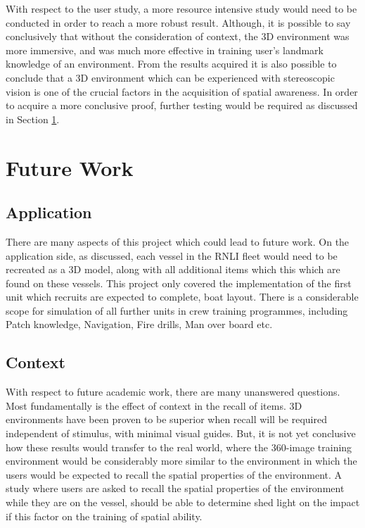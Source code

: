 \documentclass[ %
                    author={Elis Jones},
                supervisor={Dr. Kirsten Cater},
                    degree={BSc},
                     title={The Effect of Presentation Medium on Spatial Cognition},
                  subtitle={in the Virtual Environment},
                      year={2018} ]{dissertation}
\begin{document}
With respect to the user study, a more resource intensive study would need to be conducted in order to reach a more robust result. Although, it is possible to say conclusively that without the consideration of context, the 3D environment was more immersive, and was much more effective in training user's landmark knowledge of an environment. From the results acquired it is also possible to conclude that a 3D environment which can be experienced with stereoscopic vision is one of the crucial factors in the acquisition of spatial awareness. In order to acquire a more conclusive proof, further testing would be required as discussed in Section \ref{further}.   

\section{Future Work}\label{further}
\subsection{Application}
There are many aspects of this project which could lead to future work. On the application side, as discussed, each vessel in the RNLI fleet would need to be recreated as a 3D model, along with all additional items which this which are found on these vessels. This project only covered the implementation of the first unit which recruits are expected to complete, boat layout. There is a considerable scope for simulation of all further units in crew training programmes, including Patch knowledge, Navigation, Fire drills, Man over board etc. 

\subsection{Context}
With respect to future academic work, there are many unanswered questions. Most fundamentally is the effect of context in the recall of items. 3D environments have been proven to be superior when recall will be required independent of stimulus, with minimal visual guides. But, it is not yet conclusive how these results would transfer to the real world, where the 360-image training environment would be considerably more similar to the environment in which the users would be expected to recall the spatial properties of the environment. A study where users are asked to recall the spatial properties of the environment while they are on the vessel, should be able to determine shed light on the impact if this factor on the training of spatial ability. 
\end{document}
